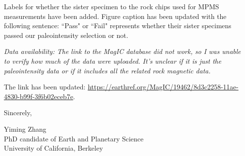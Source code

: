 \documentclass[11pt, letterpaper]{article}
\begin{document}
\begin{flushleft}
Labels for whether the sister specimen to the rock chips used for MPMS measurements have been added. Figure caption has been updated with the following sentence: ``Pass" or ``Fail" represents whether their sister specimens passed our paleointensity selection or not. 

\textit{Data availability: The link to the MagIC database did not work, so I was unable to verify how much of the data were uploaded. It's unclear if it is just the paleointensity data or if it includes all the related rock magnetic data.}

The link has been updated: \url{https://earthref.org/MagIC/19462/8d3c2258-11ae-4830-b99f-3f6b02eceb7e}. 


Sincerely,

Yiming Zhang\\

PhD candidate of Earth and Planetary Science\\

University of California, Berkeley




\end{flushleft}
\end{document}
